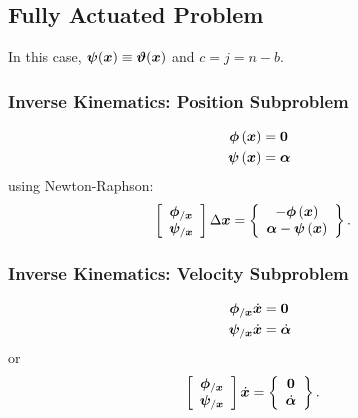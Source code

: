 \subsection{Fully Actuated Problem}
\label{sec:id:fap}
In this case, $\bm{\psi}(\bm{x}) \equiv \bm{\vartheta}(\bm{x})$
and $c = j = n - b$.

\subsubsection{Inverse Kinematics: Position Subproblem}
\begin{subequations}
\begin{align}
	\bm{\phi}\left( \bm{x} \right)
	&=
	\bm{0}
	\\
	\bm{\psi}\left( \bm{x} \right)
	&=
	\bm{\alpha}
\end{align}
\end{subequations}
using Newton-Raphson:
\begin{align}
	\left[ \begin{array}{c} 
		\bm{\phi}_{/\bm{x}}
		\\
		\bm{\psi}_{/\bm{x}}
	 \end{array} \right] \Delta\bm{x}
	&=
	\left\{ \begin{array}{c} 
		-\bm{\phi}\left( \bm{x} \right)
		\\
		\bm{\alpha}
		-
		\bm{\psi}\left( \bm{x} \right)
	 \end{array} \right\}
	.
\end{align}

\subsubsection{Inverse Kinematics: Velocity Subproblem}
\begin{subequations}
\begin{align}
	\bm{\phi}_{/\bm{x}} \dot{\bm{x}}
	&=
	\bm{0}
	\\
	\bm{\psi}_{/\bm{x}} \dot{\bm{x}}
	&=
	\dot{\bm{\alpha}}
\end{align}
\end{subequations}
or
\begin{align}
	\left[ \begin{array}{c} 
		\bm{\phi}_{/\bm{x}}
		\\
		\bm{\psi}_{/\bm{x}}
	 \end{array} \right] \dot{\bm{x}}
	&=
	\left\{ \begin{array}{c} 
		\bm{0}
		\\
		\dot{\bm{\alpha}}
	 \end{array} \right\}
	.
\end{align}

